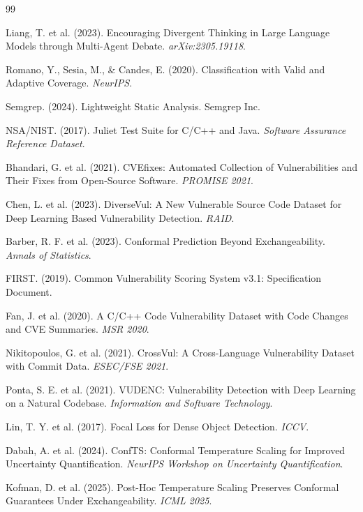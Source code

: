 \documentclass[a4paper, 12pt]{extreport}
\begin{document}
\begin{thebibliography}{99}
{ Liang, T. et al. (2023). Encouraging Divergent Thinking in Large Language Models through Multi-Agent Debate. \textit{arXiv:2305.19118}.

 Romano, Y., Sesia, M., \& Candes, E. (2020). Classification with Valid and Adaptive Coverage. \textit{NeurIPS}.

 Semgrep. (2024). Lightweight Static Analysis. Semgrep Inc.

 NSA/NIST. (2017). Juliet Test Suite for C/C++ and Java. \textit{Software Assurance Reference Dataset}.

 Bhandari, G. et al. (2021). CVEfixes: Automated Collection of Vulnerabilities and Their Fixes from Open-Source Software. \textit{PROMISE 2021}.

 Chen, L. et al. (2023). DiverseVul: A New Vulnerable Source Code Dataset for Deep Learning Based Vulnerability Detection. \textit{RAID}.

 Barber, R. F. et al. (2023). Conformal Prediction Beyond Exchangeability. \textit{Annals of Statistics}.

 FIRST. (2019). Common Vulnerability Scoring System v3.1: Specification Document.

 Fan, J. et al. (2020). A C/C++ Code Vulnerability Dataset with Code Changes and CVE Summaries. \textit{MSR 2020}.

 Nikitopoulos, G. et al. (2021). CrossVul: A Cross-Language Vulnerability Dataset with Commit Data. \textit{ESEC/FSE 2021}.

 Ponta, S. E. et al. (2021). VUDENC: Vulnerability Detection with Deep Learning on a Natural Codebase. \textit{Information and Software Technology}.

 Lin, T. Y. et al. (2017). Focal Loss for Dense Object Detection. \textit{ICCV}.

 Dabah, A. et al. (2024). ConfTS: Conformal Temperature Scaling for Improved Uncertainty Quantification. \textit{NeurIPS Workshop on Uncertainty Quantification}.

 Kofman, D. et al. (2025). Post-Hoc Temperature Scaling Preserves Conformal Guarantees Under Exchangeability. \textit{ICML 2025}.

}
\end{thebibliography}

\appendix
\renewcommand{\appendixname}{APPENDIX}

\end{document}
